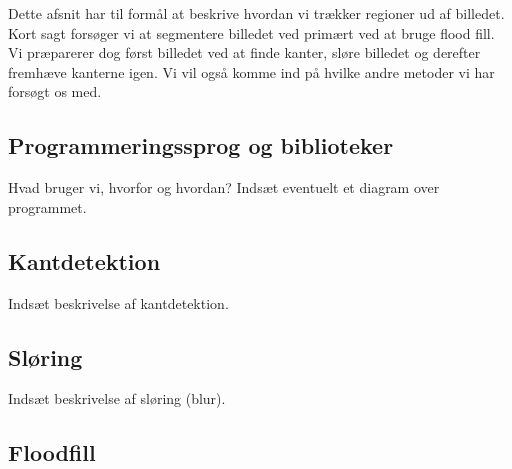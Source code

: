 {
{\sffamily Dette afsnit har til formål at beskrive hvordan vi trækker
regioner ud af billedet. Kort sagt forsøger vi at segmentere billedet
ved primært ved at bruge flood fill. Vi præparerer dog først billedet
ved at finde kanter, sløre billedet og derefter fremhæve kanterne igen.
Vi vil også komme ind på hvilke andre metoder vi har forsøgt os med.
}

\subsection{Programmeringssprog og biblioteker}
Hvad bruger vi, hvorfor og hvordan? Indsæt eventuelt et diagram over
programmet.

\subsection{Kantdetektion}
Indsæt beskrivelse af kantdetektion.

\subsection{Sløring}
Indsæt beskrivelse af sløring (blur).

\subsection{Floodfill}


}

